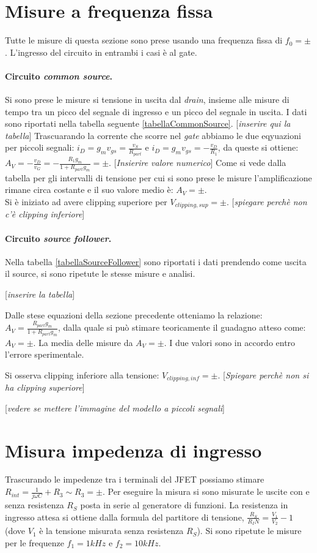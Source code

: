 \documentclass[10pt,a4paper]{article}
\newcommand{\rem}[1]{[\emph{#1}]}
\begin{document}
\section{Misure a frequenza fissa}
Tutte le misure di questa sezione sono prese usando una frequenza fissa di $f_0 = \pm$. L'ingresso del circuito in entrambi i casi è al gate.
\paragraph{Circuito \emph{common source}.}
Si sono prese le misure si tensione in uscita dal \emph{drain}, insieme alle misure di tempo tra un picco del segnale di ingresso e un picco del segnale in uscita. I dati sono riportati nella tabella seguente \ref{tabellaCommonSource}.
\rem{inserire qui la tabella}
Trascuarando la corrente che scorre nel \emph{gate} abbiamo le due eqyuazioni per piccoli segnali: $i_D = g_m v_{gs} = \frac{v_S}{R_{part}}$ e $i_D = g_m v_{gs} = -\frac{v_D}{R_1}$, da queste si ottiene: $A_V = -\frac{v_D}{v_G} = - \frac{R_1 g_m}{1+R_{part} g_m} = \pm $. \rem{Insierire valore numerico}
Come si vede dalla tabella per gli intervalli di tensione per cui si sono prese le misure l'amplificazione rimane circa costante e il suo valore medio è: $A_V = \pm$. \\
Si è iniziato ad avere clipping superiore per $V_{clipping, sup} = \pm $.
\rem{spiegare perchè non c'è clipping inferiore}

\paragraph{Circuito \emph{source follower}.}
Nella tabella \ref{tabellaSourceFollower} sono riportati i dati prendendo come uscita il source, si sono ripetute le stesse misure e analisi.

\rem{inserire la tabella}

Dalle stese equazioni della sezione precedente otteniamo la relazione: $A_V = \frac{R_{part} g_m}{1+R_{part} g_m}$, dalla quale si può stimare teoricamente il guadagno atteso come: $A_V = \pm$. La media delle misure da $A_V = \pm$. I due valori sono in accordo entro l'errore sperimentale.

Si osserva clipping inferiore alla tensione: $V_{clipping, inf} = \pm $. 
\rem{Spiegare perchè non si ha clipping superiore}

\rem{vedere se mettere l'immagine del modello a piccoli segnali}
\section{Misura impedenza di ingresso}
Trascurando le impedenze tra i terminali del JFET possiamo stimare $R_{int} = \frac{1}{j \omega C} + R_3 \sim R_3 = \pm$. Per eseguire la misura si sono misurate le uscite con e senza resistenza $R_{S}$ posta in serie al generatore di funzioni. La resistenza in ingresso attesa si ottiene dalla formula del partitore di tensione, $\frac{R_S}{R_IN} = \frac {V_1}{V_2} - 1$ (dove $V_1$ è la tensione misurata senza resistenza $R_S$). Si sono ripetute le misure per le frequenze $f_1 = 1 kHz$ e $f_2 = 10 kHz$.
\end{document}
